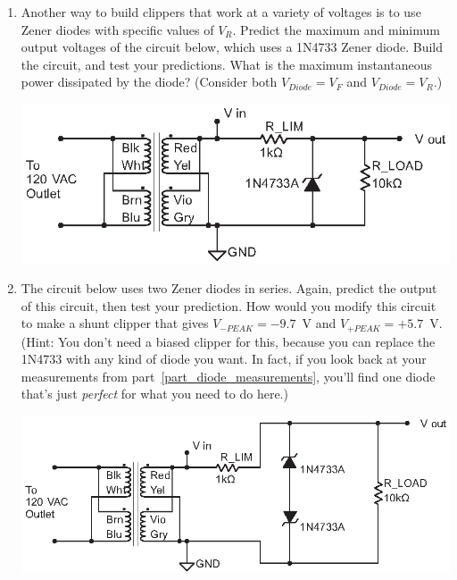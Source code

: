 \begin{enumerate}[wide]
\item Another way to build clippers that work at a variety of voltages is to use Zener diodes with specific values of $V_R$.  Predict the maximum and minimum output voltages of the circuit below, which uses a 1N4733 Zener diode.  Build the circuit, and test your predictions.  What is the maximum instantaneous power dissipated by the diode?  (Consider both $V_{Diode}=V_F$ and $V_{Diode}=V_R$.)  \label{part_zener_shunt_clipper}
\begin{center}
\includegraphics{diodes/zener_shunt_clipper.eps}
\end{center} 
 
\item The circuit below uses two Zener diodes in series.  Again, predict the output of this circuit, then test your prediction.  How would you modify this circuit to make a shunt clipper that gives $V_{-PEAK} = -9.7$~V and $V_{+PEAK} = +5.7$~V.   (Hint: You don't need a biased clipper for this, because you can replace the 1N4733 with any kind of diode you want.  In fact, if you look back at your measurements from part~\ref{part_diode_measurements}, you'll find one diode that's just \textit{perfect} for what you need to do here.)  
\begin{center}
\includegraphics{diodes/double_zener_shunt_clipper.eps}
\end{center} 
 
\end{enumerate}



